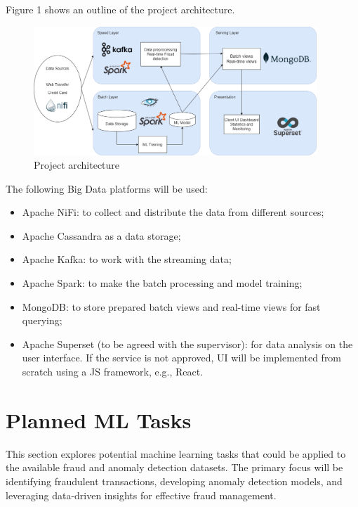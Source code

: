 \documentclass[12pt,a4paper, hidelinks]{article}
\begin{document}
Figure 1 shows an outline of the project architecture.

\begin{figure}[htbp]
    \centering
    \includegraphics[width=0.95\textwidth]{images/m2-architecture.drawio.png}
    \caption{Project architecture}
    \label{fig:architecture}
\end{figure}

The following Big Data platforms will be used:
\begin{itemize}
    \item Apache NiFi: to collect and distribute the data from different sources;
    \item Apache Cassandra as a data storage;
    \item Apache Kafka: to work with the streaming data;
    \item Apache Spark: to make the batch processing and model training;
    \item MongoDB: to store prepared batch views and real-time views for fast querying;
    \item Apache Superset (to be agreed with the supervisor): for data analysis on the user interface. If the service is not approved, UI will be implemented from scratch using a JS framework, e.g., React.
\end{itemize}

\section{Planned ML Tasks}

This section explores potential machine learning tasks that could be applied to the available fraud and anomaly detection datasets. The primary focus will be identifying fraudulent transactions, developing anomaly detection models, and leveraging data-driven insights for effective fraud management. 
\end{document}
